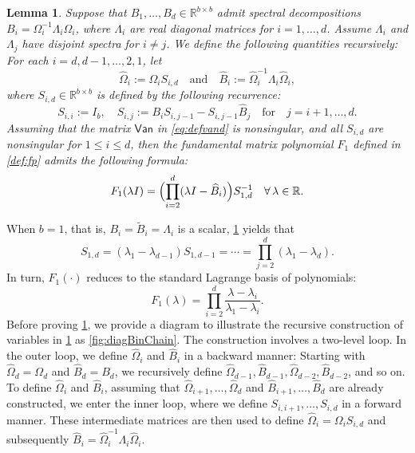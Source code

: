 \documentclass{article}
\newtheorem{lemma}{Lemma}%
\newcommand{\defi}{:=}
\newcommand{\van}{\mathsf{Van}}
\newcommand{\fp}{F}
\newcommand{\R}{\mathbb{R}}
\begin{document}
\begin{lemma}
    \label{lem:Chain}
    Suppose that $B_{1},\dotsc,B_{d}\in\R^{b\times b}$ admit spectral decompositions $B_{i}=\Omega_{i}^{-1}\Lambda_{i}\Omega_{i}$, where $\Lambda_{i}$ are real diagonal matrices for $i=1,\dotsc,d$. Assume $\Lambda_{i}$ and $\Lambda_{j}$ have disjoint spectra for $i\neq j$.
    We define the following quantities recursively: For each $i=d,d-1,\dotsc,2,1$, let  
    \begin{equation*}
        \widehat{\Omega}_{i} \defi \Omega_{i}S_{i,d}\quad\text{and}\quad  
        \widehat{B}_{i}\defi \widehat{\Omega}_{i}^{-1}\Lambda_{i}\widehat{\Omega}_{i},
    \end{equation*}
    where $S_{i,d}\in\R^{b\times b}$ is defined by the following recurrence:
    \begin{equation*}
        S_{i,i} \defi  I_{b},\quad  S_{i,j} \defi  B_{i}S_{i,j-1}-S_{i,j-1}\widehat{B}_{j} \quad\text{for}\quad j=i+1,\dotsc,d.
    \end{equation*} 
    Assuming that the matrix $\van$ in \cref{eq:defvand} is nonsingular, and all $S_{i,d}$ are nonsingular for $1\leq i\leq d$, then the fundamental matrix polynomial $\fp_{1}$ defined in \cref{def:fp} admits the following formula: 
    \begin{equation}
    \label{eq:deffp1}
        \fp_{1}(\lambda I) = \Bigl(\prod_{i=2}^{d}(\lambda I-\widehat{B}_{i})\Bigr)S_{1,d}^{-1}\quad \forall\, \lambda\in\R.
    \end{equation}
\end{lemma}


When $b=1$, that is, $B_{i}=\widetilde{B}_{i}=\Lambda_{i}$ is a scalar, \cref{lem:Chain} yields that  
\begin{equation*}
    S_{1,d} = (\lambda_{1}-\lambda_{d-1})S_{1,d-1} = \dotsb = \prod_{j=2}^{d}(\lambda_{1}-\lambda_{d}).
\end{equation*}
In turn, $F_{1}(\cdot)$ reduces to the standard Lagrange basis of polynomials:
\begin{equation*}
    F_{1}(\lambda) = \prod_{i=2}^{d}\frac{\lambda-\lambda_{i}}{\lambda_{1}-\lambda_{i}}.
\end{equation*}
Before proving \cref{lem:Chain}, we provide a diagram to illustrate the recursive construction of variables in \cref{lem:Chain} as \cref{fig:diagBinChain}. 
The construction involves a two-level loop. In the outer loop, we define $\widehat{\Omega}_{i}$ and $\widehat{B}_{i}$ in a backward manner: Starting with $\widehat{\Omega}_{d}=\Omega_{d}$ and $\widehat{B}_{d}=B_{d}$, we recursively define $\widehat{\Omega}_{d-1},\widehat{B}_{d-1}, \widehat{\Omega}_{d-2},\widehat{B}_{d-2}$, and so on. 
To define $\widehat{\Omega}_{i}$ and $\widehat{B}_{i}$, assuming that $\widehat{\Omega}_{i+1},\dotsc,\widehat{\Omega}_{d}$ and $\widehat{B}_{i+1},\dotsc,\widehat{B}_{d}$ are already constructed, we enter the inner loop, where we define $S_{i,i+1},\dotsc,S_{i,d}$ in a forward manner. These intermediate matrices are then used to define $\widehat{\Omega}_{i}=\Omega_{i}S_{i,d}$ and subsequently $\widehat{B}_{i}=\widehat{\Omega}_{i}^{-1}\Lambda_{i}\widehat{\Omega}_{i}$.
\end{document}
